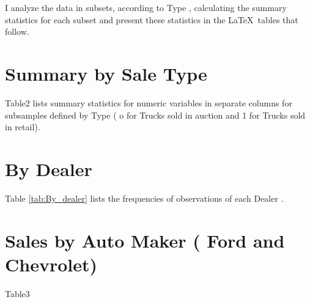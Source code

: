 \documentclass[11pt]{article}
\begin{document}
\medskip
\noindent
I analyze the data in subsets, according to Type ,
calculating the summary statistics for each subset and present these
statistics in the \LaTeX\ tables that follow.

\vfill


\pagebreak
\section{Summary by Sale Type}

Table2 lists summary statistics for numeric variables
in separate columns for subsamples defined by Type ( o for Trucks sold in auction and 1 for Trucks sold in retail).





\section{By Dealer}

Table \ref{tab:By_dealer} lists the frequencies of observations of
each Dealer .



\pagebreak
\section{Sales by Auto Maker ( Ford and Chevrolet)}

Table3





\end{document}
